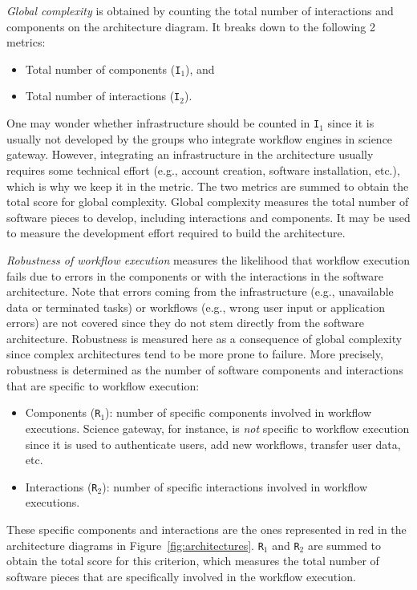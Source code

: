\documentclass[preprint,3p,twocolumn]{elsarticle}
\begin{document}
\emph{Global complexity} is obtained by counting the total number of
interactions and components on the architecture diagram. It breaks
down to the following 2 metrics:
\begin{itemize}[leftmargin=0cm,itemindent=0.35cm,itemsep=0cm]
\item Total number of components (\texttt{I$_1$}), and
\item Total number of interactions (\texttt{I$_2$}).
\end{itemize}
One may wonder whether infrastructure should be counted in
\texttt{I$_1$} since it is usually not developed by the groups who
integrate workflow engines in science gateway. However, integrating an
infrastructure in the architecture usually requires some technical
effort (e.g., account creation, software installation, etc.), which is
why we keep it in the metric. The two metrics are summed to obtain the
total score for global complexity. Global complexity measures the
total number of software pieces to develop, including interactions and
components. It may be used to measure the development effort required
to build the architecture.

\emph{Robustness of workflow execution} measures the likelihood that
workflow execution fails due to errors in the components or with the
interactions in the software architecture. Note that errors coming
from the infrastructure (e.g., unavailable data or terminated tasks)
or workflows (e.g., wrong user input or application errors) are not
covered since they do not stem directly from the software
architecture. Robustness is measured here as a consequence of global
complexity since complex architectures tend to be more prone to
failure. More precisely, robustness is determined as the number of
software components and interactions that are specific to workflow
execution:
\begin{itemize}[leftmargin=0cm,itemindent=0.35cm,itemsep=0cm]
\item Components (\texttt{R$_1$}): number of specific components
  involved in workflow executions. Science
gateway, for instance, is \emph{not} specific to workflow execution
since it is used to authenticate users, add new workflows, transfer
user data, etc.
\item Interactions (\texttt{R$_2$}): number of specific interactions
  involved in workflow executions.
\end{itemize}
These specific components and interactions are the ones represented in
red in the architecture diagrams in
Figure~\ref{fig:architectures}. \texttt{R$_1$} and \texttt{R$_2$} are
summed to obtain the total score for this criterion, which measures
the total number of software pieces that are specifically involved in
the workflow execution.
\end{document}
